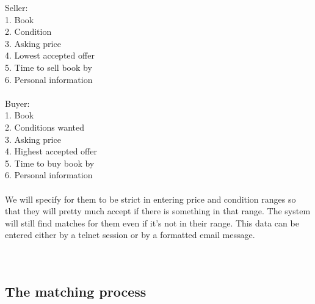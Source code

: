 Seller:\\
1.	Book\\
2.	Condition\\
3.	Asking price\\
4.	Lowest accepted offer\\
5.	Time to sell book by\\
6.	Personal information\\
\\
Buyer:\\
1.	Book\\
2.	Conditions wanted\\
3.	Asking price\\
4.	Highest accepted offer\\
5.	Time to buy book by\\
6.	Personal information\\
\\
We will specify for them to be strict in entering price and condition ranges so
that they will pretty much accept if there is something in that range.  The
system will still find matches for them even if it's not in their range.
This data can be entered either by a telnet session or by a formatted email
message.\\
\\
\\

\subsection{The matching process}

